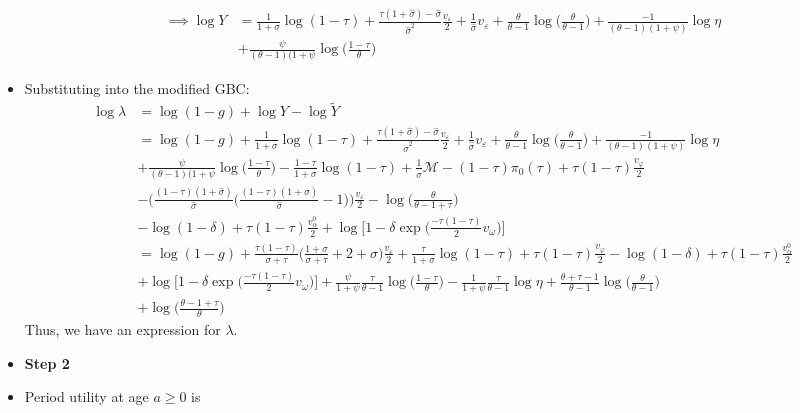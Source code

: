 \documentclass{article}
\newcommand{\M}{\mathcal{M}}
\begin{document}
\begin{itemize}
\begin{align*}
\implies
\log Y &=\frac{1}{1+\sigma} \log (1-\tau) + \frac{\tau(1+\hat\sigma) - \hat \sigma}{\hat \sigma^2}\frac{v_\varepsilon}{2} + \frac{1}{\hat\sigma} v_\varepsilon + \frac{\theta}{\theta-1}\log\Big( \frac{\theta}{\theta-1} \Big) + \frac{-1}{(\theta-1)(1+\psi)} \log \eta\\ &+ \frac{\psi}{(\theta-1)(1+\psi} \log \Big( \frac{1-\tau}{\theta} \Big)
\end{align*}
\item Substituting into the modified GBC:
\begin{align*}
\log \lambda 
&= \log (1-g) + \log Y - \log \tilde Y\\
&= \log (1-g) + \frac{1}{1+\sigma} \log (1-\tau) + \frac{\tau(1+\hat\sigma) - \hat \sigma}{\hat \sigma^2}\frac{v_\varepsilon}{2} + \frac{1}{\hat\sigma} v_\varepsilon + \frac{\theta}{\theta-1}\log\Big( \frac{\theta}{\theta-1} \Big) + \frac{-1}{(\theta-1)(1+\psi)} \log \eta\\ &+ \frac{\psi}{(\theta-1)(1+\psi} \log \Big( \frac{1-\tau}{\theta} \Big) - \frac{1-\tau}{1+\sigma} \log(1-\tau) + \frac{1}{\hat\sigma} \M - (1-\tau)\pi_0(\tau) + \tau(1-\tau)\frac{v_\varphi}{2} \\
& - \Big( \frac{(1-\tau)(1+\hat\sigma)}{\hat \sigma}\Big(\frac{(1-\tau)(1+\hat\sigma)}{\hat \sigma} - 1 \Big)\Big) \frac{v_\varepsilon}{2} - \log\Bigg(  \frac{\theta}{\theta - 1 + \tau}\Bigg) \\
&- \log(1-\delta) + \tau(1-\tau)\frac{v_\alpha^0}{2} + \log\Big[ 1 - \delta \exp\Big( \frac{-\tau(1-\tau)}{2}v_\omega \Big) \Big]\\
&= \log (1-g) + \frac{\tau(1-\tau)}{\sigma + \tau} \Big( \frac{1+\sigma}{\sigma + \tau} + 2 + \sigma \Big)\frac{v_\varepsilon}{2} + \frac{\tau}{1+\sigma} \log(1-\tau) + \tau(1-\tau)\frac{v_\varphi}{2} - \log(1-\delta) + \tau(1-\tau)\frac{v_\alpha^0}{2} \\
&+ \log \Big[ 1 - \delta \exp\Big( \frac{-\tau(1-\tau)}{2}v_\omega \Big) \Big] + \frac{\psi}{1+\psi}\frac{\tau}{\theta-1}\log \Big( \frac{1-\tau}{\theta}\Big) - \frac{1}{1+\psi}\frac{\tau}{\theta-1} \log \eta + \frac{\theta + \tau - 1}{\theta - 1} \log \Big( \frac{\theta}{\theta - 1} \Big) \\
&+ \log \Big( \frac{\theta - 1 + \tau}{\theta} \Big)
\end{align*}
Thus, we have an expression for $\lambda$.
\pagebreak
\item \textbf{Step 2}
\item Period utility at age $a \ge 0$ is
\begin{align*}

\end{align*}
\end{itemize}
\end{document}
